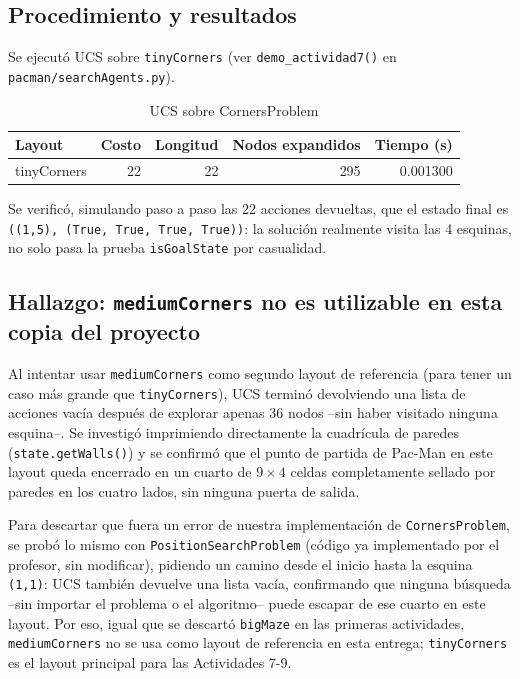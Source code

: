 \subsection{Procedimiento y resultados}

Se ejecutó UCS sobre \texttt{tinyCorners} (ver \texttt{demo\_actividad7()} en \texttt{pacman/searchAgents.py}).

\begin{table}[H]
\centering
\caption{UCS sobre CornersProblem}
\label{tab:act7-ucs}
\begin{tabular}{lrrrr}
\toprule
\textbf{Layout} & \textbf{Costo} & \textbf{Longitud} & \textbf{Nodos expandidos} & \textbf{Tiempo (s)} \\
\midrule
tinyCorners & 22 & 22 & 295 & 0.001300 \\
\bottomrule
\end{tabular}
\end{table}

Se verificó, simulando paso a paso las 22 acciones devueltas, que el estado final es
\texttt{((1,5), (True, True, True, True))}: la solución realmente visita las 4 esquinas, no solo
pasa la prueba \texttt{isGoalState} por casualidad.

\subsection{Hallazgo: \texttt{mediumCorners} no es utilizable en esta copia del proyecto}

Al intentar usar \texttt{mediumCorners} como segundo layout de referencia (para tener un caso más
grande que \texttt{tinyCorners}), UCS terminó devolviendo una lista de acciones vacía después de
explorar apenas 36 nodos --sin haber visitado ninguna esquina--. Se investigó imprimiendo
directamente la cuadrícula de paredes (\texttt{state.getWalls()}) y se confirmó que el punto de
partida de Pac-Man en este layout queda encerrado en un cuarto de $9\times4$ celdas completamente
sellado por paredes en los cuatro lados, sin ninguna puerta de salida.

Para descartar que fuera un error de nuestra implementación de \texttt{CornersProblem}, se probó lo
mismo con \texttt{PositionSearchProblem} (código ya implementado por el profesor, sin modificar),
pidiendo un camino desde el inicio hasta la esquina \texttt{(1,1)}: UCS también devuelve una lista
vacía, confirmando que ninguna búsqueda --sin importar el problema o el algoritmo-- puede escapar
de ese cuarto en este layout. Por eso, igual que se descartó \texttt{bigMaze} en las primeras
actividades, \texttt{mediumCorners} no se usa como layout de referencia en esta entrega;
\texttt{tinyCorners} es el layout principal para las Actividades 7-9.

